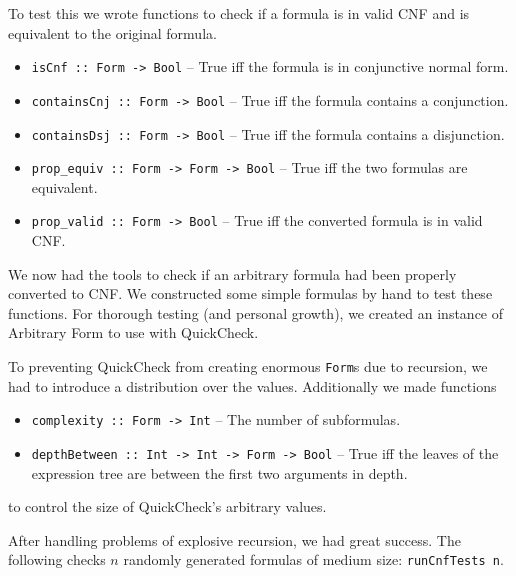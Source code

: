 \documentclass[11pt,a4paper]{article}
\numberwithin{equation}{section}%
\begin{document}
To test this we wrote functions to check if a formula is in valid CNF and is equivalent to the original formula.
\begin{itemize}
    \item \texttt{isCnf :: Form -> Bool} \--- True iff the formula is in conjunctive normal form.
    \item \texttt{containsCnj :: Form -> Bool} \--- True iff the formula contains a conjunction.
    \item \texttt{containsDsj :: Form -> Bool} \--- True iff the formula contains a disjunction.
    \item \texttt{prop\_equiv :: Form -> Form -> Bool} \--- True iff the two formulas are equivalent.
    \item \texttt{prop\_valid :: Form -> Bool} \--- True iff the converted formula is in valid CNF.
\end{itemize}

We now had the tools to check if an arbitrary formula had been properly converted to CNF. We constructed some simple formulas by hand to test these functions. For thorough testing (and personal growth), we created an instance of Arbitrary Form to use with QuickCheck. 

To preventing QuickCheck from creating enormous \texttt{Form}s due to recursion, we had to introduce a distribution over the values. Additionally we made functions
\begin{itemize}
    \item \texttt{complexity :: Form -> Int} \--- The number of subformulas.
    \item \texttt{depthBetween :: Int -> Int -> Form -> Bool} \--- True iff the leaves of the expression tree are between the first two arguments in depth.
\end{itemize}
to control the size of QuickCheck's arbitrary values.

After handling problems of explosive recursion, we had great success. The following checks $n$ randomly generated formulas of medium size: \texttt{runCnfTests n}.
\end{document}
